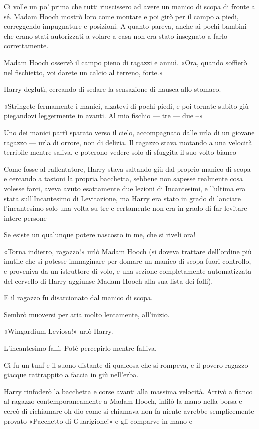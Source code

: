 Ci volle un po’ prima che tutti riuscissero ad avere un manico di scopa di fronte a sé. Madam Hooch mostrò loro come montare e poi girò per il campo a piedi, correggendo impugnature e posizioni. A quanto pareva, anche ai pochi bambini che erano stati autorizzati a volare a casa non era stato insegnato a farlo correttamente.

Madam Hooch osservò il campo pieno di ragazzi e annuì. «Ora, quando soffierò nel fischietto, voi darete un calcio al terreno, forte.»

Harry deglutì, cercando di sedare la sensazione di nausea allo stomaco.

«Stringete fermamente i manici, alzatevi di pochi piedi, e poi tornate subito giù piegandovi leggermente in avanti. Al mio fischio — tre — due –»

Uno dei manici partì sparato verso il cielo, accompagnato dalle urla di un giovane ragazzo — urla di orrore, non di delizia. Il ragazzo stava ruotando a una velocità terribile mentre saliva, e poterono vedere solo di sfuggita il suo volto bianco –

Come fosse al rallentatore, Harry stava saltando giù dal proprio manico di scopa e cercando a tastoni la propria bacchetta, sebbene non sapesse realmente cosa volesse farci, aveva avuto esattamente due lezioni di Incantesimi, e l’ultima era stata sull’Incantesimo di Levitazione, ma Harry era stato in grado di lanciare l’incantesimo solo una volta su tre e certamente non era in grado di far levitare intere persone –

Se esiste un qualunque potere nascosto in me, che si riveli ora!

«Torna indietro, ragazzo!» urlò Madam Hooch (si doveva trattare dell’ordine più inutile che si potesse immaginare per domare un manico di scopa fuori controllo, e proveniva da un istruttore di volo, e una sezione completamente automatizzata del cervello di Harry aggiunse Madam Hooch alla sua lista dei folli).

E il ragazzo fu disarcionato dal manico di scopa.

Sembrò muoversi per aria molto lentamente, all’inizio.

«Wingardium Leviosa!» urlò Harry.

L’incantesimo fallì. Poté percepirlo mentre falliva.

Ci fu un tunf e il suono distante di qualcosa che si rompeva, e il povero ragazzo giacque rattrappito a faccia in giù nell’erba.

Harry rinfoderò la bacchetta e corse avanti alla massima velocità. Arrivò a fianco al ragazzo contemporaneamente a Madam Hooch, infilò la mano nella borsa e cercò di richiamare oh dio come si chiamava non fa niente avrebbe semplicemente provato «Pacchetto di Guarigione!» e gli comparve in mano e –

